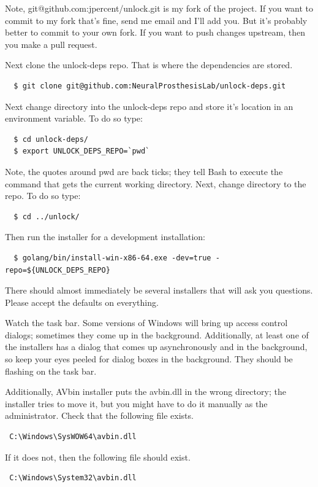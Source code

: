\documentclass[11pt]{article}
\begin{document}
Note, git@github.com:jpercent/unlock.git is my fork of the project.  If you want to commit to my fork that's fine, send me email and I'll add you.  But it's probably better to commit to your own fork.  If you want to push changes upstream, then you make a pull request.  


Next clone the unlock-deps repo.  That is where the dependencies are stored.
\begin{verbatim}  
  $ git clone git@github.com:NeuralProsthesisLab/unlock-deps.git
\end{verbatim}

Next change directory into the unlock-deps repo and store it's location in an environment variable.  To do so type:
\begin{verbatim}
  $ cd unlock-deps/
  $ export UNLOCK_DEPS_REPO=`pwd`
\end{verbatim}

Note, the quotes around pwd are back ticks; they tell Bash to execute the command that gets the current working directory.   Next, change directory to the repo.  To do so type:
\begin{verbatim}
  $ cd ../unlock/
\end{verbatim}

Then run the installer for a development installation:
\begin{verbatim}
  $ golang/bin/install-win-x86-64.exe -dev=true -repo=${UNLOCK_DEPS_REPO}
\end{verbatim}
There should almost immediately be several installers that will ask you questions.  Please accept the defaults on everything.  

Watch the task bar.  Some versions of Windows will bring up access control dialogs; sometimes they come up in the background.  Additionally, at least one of the installers has a dialog that comes up asynchronously and in the background, so keep your eyes peeled for dialog boxes in the background.  They should be flashing on the task bar.

Additionally, AVbin installer puts the avbin.dll in the wrong directory; the installer tries to move it, but you might have to do it manually as the administrator. Check that the following file exists.  

\begin{verbatim} 
 C:\Windows\SysWOW64\avbin.dll 
 \end{verbatim}  
 
 If it does not, then the following file should exist.
 \begin{verbatim}
 C:\Windows\System32\avbin.dll
 \end{verbatim} 
 
\end{document}
